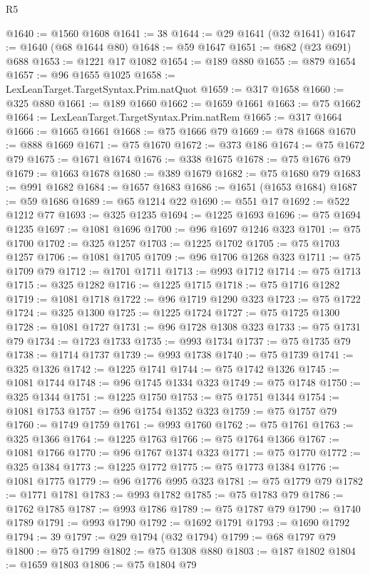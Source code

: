 \begin{lexlean}{R5}
\begin{coremodule}
@1640 := @1560 @1608
@1641 := 38
@1644 := @29 @1641 (@32 @1641)
@1647 := @1640 (@68 @1644 @80)
@1648 := @59 @1647
@1651 := @682 (@23 @691) @688
@1653 := @1221 @17 @1082
@1654 := @189 @880
@1655 := @879 @1654
@1657 := @96 @1655 @1025
@1658 := LexLeanTarget.TargetSyntax.Prim.natQuot
@1659 := @317 @1658
@1660 := @325 @880
@1661 := @189 @1660
@1662 := @1659 @1661
@1663 := @75 @1662
@1664 := LexLeanTarget.TargetSyntax.Prim.natRem
@1665 := @317 @1664
@1666 := @1665 @1661
@1668 := @75 @1666 @79
@1669 := @78 @1668
@1670 := @888 @1669
@1671 := @75 @1670
@1672 := @373 @186
@1674 := @75 @1672 @79
@1675 := @1671 @1674
@1676 := @338 @1675
@1678 := @75 @1676 @79
@1679 := @1663 @1678
@1680 := @389 @1679
@1682 := @75 @1680 @79
@1683 := @991 @1682
@1684 := @1657 @1683
@1686 := @1651 (@1653 @1684)
@1687 := @59 @1686
@1689 := @65 @1214 @22
@1690 := @551 @17
@1692 := @522 @1212 @77
@1693 := @325 @1235
@1694 := @1225 @1693
@1696 := @75 @1694 @1235
@1697 := @1081 @1696
@1700 := @96 @1697 @1246 @323
@1701 := @75 @1700
@1702 := @325 @1257
@1703 := @1225 @1702
@1705 := @75 @1703 @1257
@1706 := @1081 @1705
@1709 := @96 @1706 @1268 @323
@1711 := @75 @1709 @79
@1712 := @1701 @1711
@1713 := @993 @1712
@1714 := @75 @1713
@1715 := @325 @1282
@1716 := @1225 @1715
@1718 := @75 @1716 @1282
@1719 := @1081 @1718
@1722 := @96 @1719 @1290 @323
@1723 := @75 @1722
@1724 := @325 @1300
@1725 := @1225 @1724
@1727 := @75 @1725 @1300
@1728 := @1081 @1727
@1731 := @96 @1728 @1308 @323
@1733 := @75 @1731 @79
@1734 := @1723 @1733
@1735 := @993 @1734
@1737 := @75 @1735 @79
@1738 := @1714 @1737
@1739 := @993 @1738
@1740 := @75 @1739
@1741 := @325 @1326
@1742 := @1225 @1741
@1744 := @75 @1742 @1326
@1745 := @1081 @1744
@1748 := @96 @1745 @1334 @323
@1749 := @75 @1748
@1750 := @325 @1344
@1751 := @1225 @1750
@1753 := @75 @1751 @1344
@1754 := @1081 @1753
@1757 := @96 @1754 @1352 @323
@1759 := @75 @1757 @79
@1760 := @1749 @1759
@1761 := @993 @1760
@1762 := @75 @1761
@1763 := @325 @1366
@1764 := @1225 @1763
@1766 := @75 @1764 @1366
@1767 := @1081 @1766
@1770 := @96 @1767 @1374 @323
@1771 := @75 @1770
@1772 := @325 @1384
@1773 := @1225 @1772
@1775 := @75 @1773 @1384
@1776 := @1081 @1775
@1779 := @96 @1776 @995 @323
@1781 := @75 @1779 @79
@1782 := @1771 @1781
@1783 := @993 @1782
@1785 := @75 @1783 @79
@1786 := @1762 @1785
@1787 := @993 @1786
@1789 := @75 @1787 @79
@1790 := @1740 @1789
@1791 := @993 @1790
@1792 := @1692 @1791
@1793 := @1690 @1792
@1794 := 39
@1797 := @29 @1794 (@32 @1794)
@1799 := @68 @1797 @79
@1800 := @75 @1799
@1802 := @75 @1308 @880
@1803 := @187 @1802
@1804 := @1659 @1803
@1806 := @75 @1804 @79

\end{coremodule}
\end{lexlean}
